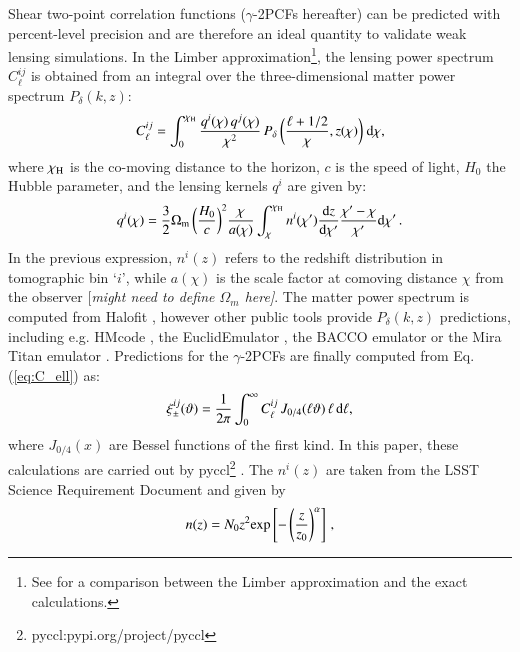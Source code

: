 \documentclass[useAMS,usenatbib]{mn2e}
\begin{document}
 Shear two-point correlation functions ($\gamma$-2PCFs hereafter) can be predicted with percent-level precision and are therefore an ideal quantity to validate weak lensing simulations. In the Limber approximation\footnote{See \citet{Kilbinger17} for a comparison between the Limber approximation and the exact calculations.}, the lensing power spectrum $C^{ij}_{\ell}$ is obtained from an integral over the three-dimensional matter power spectrum $P_{\delta}(k,z)$:
  \begin{eqnarray}
C_{\ell}^{ij} = \int_0^{\chi_{\rm H}}  \frac{q^i(\chi) \,q^j(\chi)}{\chi^2} \, P_{\delta}\, \bigg(\frac{\ell+1/2}{\chi},z(\chi)\bigg) \ {\rm d}\chi,
\label{eq:C_ell}
\end{eqnarray}
where $\chi_{\rm H}$ is the co-moving distance to the horizon, $c$ is the speed of light, $H_0$ the Hubble parameter,  and the  lensing kernels $q^{i}$ are given by:
\begin{eqnarray}
q^i(\chi) = \frac{3}{2}\Omega_{\rm m} \, \bigg(\frac{H_0}{c} \bigg)^2 \frac{\chi}{a(\chi)} \int_{\chi}^{\chi_{\rm H}} n^i(\chi')\frac{{\rm d}z}{{\rm d} \chi'}\frac{\chi' - \chi}{\chi'}{\rm d}\chi' \, .
\label{eq:q_lensing}
\end{eqnarray}
In the previous expression, $n^i(z)$ refers to the redshift distribution  in tomographic bin `$i$', while $a(\chi)$ is the scale factor at comoving distance $\chi$ from the observer {[\it might need to define $\Omega_m$ here]}.  
 The matter power spectrum is computed from  {\sc Halofit} \citep{Takahashi2012}, however  other public tools provide $P_{\delta}(k,z)$ predictions, including e.g. {\sc HMcode} \citep{HMCode2020}, the {\sc EuclidEmulator} \citep{EuclidEmulator}, the {\sc BACCO} emulator \citep{BACCOEmulator} or the Mira Titan emulator \citep{miraTitan}. 
 Predictions for the $\gamma$-2PCFs are finally computed from Eq. (\ref{eq:C_ell}) as:
 \begin{eqnarray}
\xi_{\pm}^{ij}(\vartheta) = \frac{1}{2\pi}\int_0^{\infty} C_{\ell}^{ij} \, J_{0/4}(\ell \vartheta) \, \ell \, {\rm d}\ell,
\label{eq:xipm_th}
\end{eqnarray}
where $J_{0/4}(x)$ are Bessel functions of the first kind. In this paper, these calculations are carried out by {\sc pyccl}\footnote{{\sc pyccl}:pypi.org/project/pyccl}  \citep{CCL}.
The $n^i(z)$ are taken from the LSST Science Requirement Document \citep{LSST-SRD} and given by
 \begin{eqnarray}
n(z) = N_0 z^2 {\rm exp} \left[-\left(\frac{z}{z_0}\right)^\alpha \right]\, ,
\label{eq:nz}
\end{eqnarray}
\end{document}
